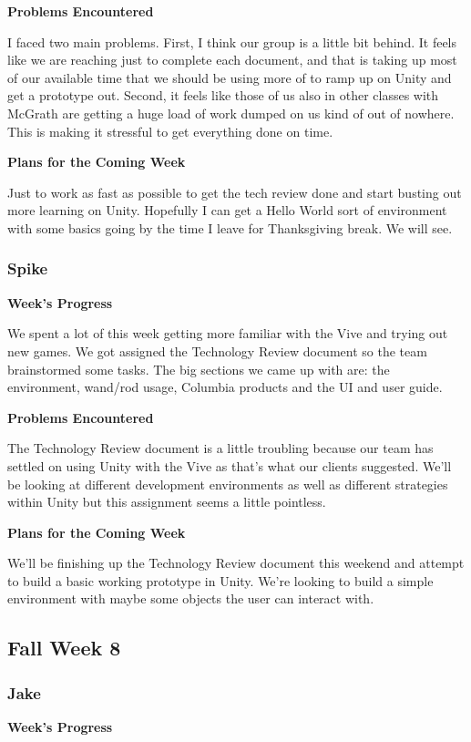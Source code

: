 \documentclass[10pt,journal,compsoc,onecolumn, draftclsnofoot]{IEEEtran}
\begin{document}
\noindent \textbf{Problems Encountered}

I faced two main problems.  First, I think our group is a little bit behind.  It feels like we are reaching just to complete each document, and that is taking up most of our available time that we should be using more of to ramp up on Unity and get a prototype out.  Second, it feels like those of us also in other classes with McGrath are getting a huge load of work dumped on us kind of out of nowhere.  This is making it stressful to get everything done on time.

\noindent \textbf{Plans for the Coming Week}

Just to work as fast as possible to get the tech review done and start busting out more learning on Unity.  Hopefully I can get a Hello World sort of environment with some basics going by the time I leave for Thanksgiving break.  We will see.

\subsubsection{Spike}
\noindent \textbf{Week's Progress}

We spent a lot of this week getting more familiar with the Vive and trying out new games. We got assigned the Technology Review document so the team brainstormed some tasks. The big sections we came up with are: the environment, wand/rod usage, Columbia products and the UI and user guide.

\noindent \textbf{Problems Encountered}

The Technology Review document is a little troubling because our team has settled on using Unity with the Vive as that's what our clients suggested. We'll be looking at different development environments as well as different strategies within Unity but this assignment seems a little pointless.


\noindent \textbf{Plans for the Coming Week}

We'll be finishing up the Technology Review document this weekend and attempt to build a basic working prototype in Unity. We're looking to build a simple environment with maybe some objects the user can interact with.

\subsection{Fall Week 8}
\subsubsection{Jake}
\noindent \textbf{Week's Progress}
\end{document}
